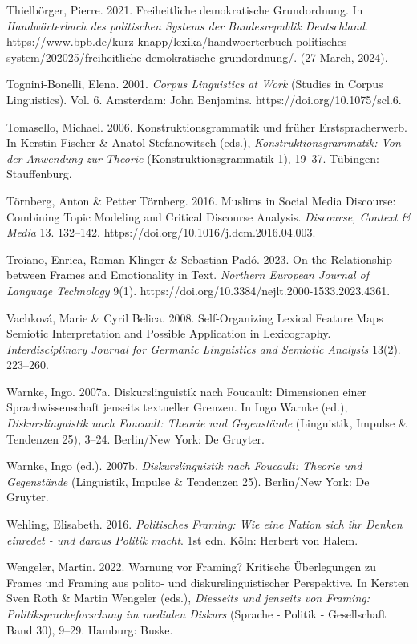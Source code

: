 Thielbörger, Pierre. 2021. Freiheitliche demokratische Grundordnung. In \emph{Handwörterbuch des politischen Systems der Bundesrepublik Deutschland}. https://www.bpb.de/kurz-knapp/lexika/handwoerterbuch-politisches-system/202025/freiheitliche-demokratische-grundordnung/. (27 March, 2024).

Tognini-Bonelli, Elena. 2001. \emph{Corpus Linguistics at Work} (Studies in Corpus Linguistics). Vol. 6. Amsterdam: John Benjamins. https://doi.org/10.1075/scl.6.

Tomasello, Michael. 2006. Konstruktionsgrammatik und früher Erstspracherwerb. In Kerstin Fischer \& Anatol Stefanowitsch (eds.), \emph{Konstruktionsgrammatik: Von der Anwendung zur Theorie} (Konstruktionsgrammatik 1), 19--37. Tübingen: Stauffenburg.

Törnberg, Anton \& Petter Törnberg. 2016. Muslims in Social Media Discourse: Combining Topic Modeling and Critical Discourse Analysis. \emph{Discourse, Context \& Media} 13. 132--142. https://doi.org/10.1016/j.dcm.2016.04.003.

Troiano, Enrica, Roman Klinger \& Sebastian Padó. 2023. On the Relationship between Frames and Emotionality in Text. \emph{Northern European Journal of Language Technology} 9(1). https://doi.org/10.3384/nejlt.2000-1533.2023.4361.

Vachková, Marie \& Cyril Belica. 2008. Self-Organizing Lexical Feature Maps Semiotic Interpretation and Possible Application in Lexicography. \emph{Interdisciplinary Journal for Germanic Linguistics and Semiotic Analysis} 13(2). 223--260.

Warnke, Ingo. 2007a. Diskurslinguistik nach Foucault: Dimensionen einer Sprachwissenschaft jenseits textueller Grenzen. In Ingo Warnke (ed.), \emph{Diskurslinguistik nach Foucault: Theorie und Gegenstände} (Linguistik, Impulse \& Tendenzen 25), 3--24. Berlin/New York: De Gruyter.

Warnke, Ingo (ed.). 2007b. \emph{Diskurslinguistik nach Foucault: Theorie und Gegenstände} (Linguistik, Impulse \& Tendenzen 25). Berlin/New York: De Gruyter.

Wehling, Elisabeth. 2016. \emph{Politisches Framing: Wie eine Nation sich ihr Denken einredet - und daraus Politik macht}. 1st edn. Köln: Herbert von Halem.

Wengeler, Martin. 2022. Warnung vor Framing? Kritische Überlegungen zu Frames und Framing aus polito- und diskurslinguistischer Perspektive. In Kersten Sven Roth \& Martin Wengeler (eds.), \emph{Diesseits und jenseits von Framing: Politikspracheforschung im medialen Diskurs} (Sprache - Politik - Gesellschaft Band 30), 9--29. Hamburg: Buske.

